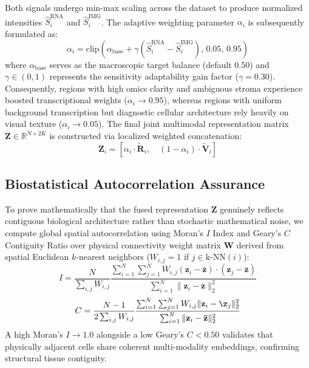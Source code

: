 \documentclass[journal,10pt,twocolumn]{IEEEtran}
\begin{document}
Both signals undergo min-max scaling across the dataset to produce normalized intensities $\hat{S}_i^{\text{RNA}}$ and $\hat{S}_i^{\text{IMG}}$. The adaptive weighting parameter $\alpha_i$ is subsequently formulated as:
\begin{equation}
\alpha_i = \text{clip}\left(\alpha_{\text{base}} + \gamma \left(\hat{S}_i^{\text{RNA}} - \hat{S}_i^{\text{IMG}}\right), \, 0.05, \, 0.95 \right)
\end{equation}
where $\alpha_{\text{base}}$ serves as the macroscopic target balance (default 0.50) and $\gamma \in (0, 1)$ represents the sensitivity adaptability gain factor ($\gamma = 0.30$). Consequently, regions with high omics clarity and ambiguous stroma experience boosted transcriptional weights ($\alpha_i \to 0.95$), whereas regions with uniform background transcription but diagnostic cellular architecture rely heavily on visual texture ($\alpha_i \to 0.05$). The final joint multimodal representation matrix $\mathbf{Z} \in \mathbb{R}^{N \times 2K}$ is constructed via localized weighted concatenation:
\begin{equation}
\mathbf{Z}_i = \left[ \alpha_i \cdot \mathbf{\tilde{R}}_i, \quad (1 - \alpha_i) \cdot \mathbf{\tilde{V}}_i \right]
\end{equation}

\subsection{Biostatistical Autocorrelation Assurance}
To prove mathematically that the fused representation $\mathbf{Z}$ genuinely reflects contiguous biological architecture rather than stochastic mathematical noise, we compute global spatial autocorrelation using Moran's $I$ Index and Geary's $C$ Contiguity Ratio over physical connectivity weight matrix $\mathbf{W}$ derived from spatial Euclidean $k$-nearest neighbors ($W_{i,j}=1$ if $j \in \text{k-NN}(i)$):
\begin{equation}
I = \frac{N}{\sum_{i,j} W_{i,j}} \frac{\sum_{i=1}^N \sum_{j=1}^N W_{i,j} (\mathbf{z}_i - \mathbf{\bar{z}}) \cdot (\mathbf{z}_j - \mathbf{\bar{z}})}{\sum_{i=1}^N \|\mathbf{z}_i - \mathbf{\bar{z}}\|_2^2}
\end{equation}
\begin{equation}
C = \frac{N - 1}{2 \sum_{i,j} W_{i,j}} \frac{\sum_{i=1}^N \sum_{j=1}^N W_{i,j} \|\mathbf{z}_i - \mathbf{\z}_j\|_2^2}{\sum_{i=1}^N \|\mathbf{z}_i - \mathbf{\bar{z}}\|_2^2}
\end{equation}
A high Moran's $I \to 1.0$ alongside a low Geary's $C < 0.50$ validates that physically adjacent cells share coherent multi-modality embeddings, confirming structural tissue contiguity.
\end{document}
